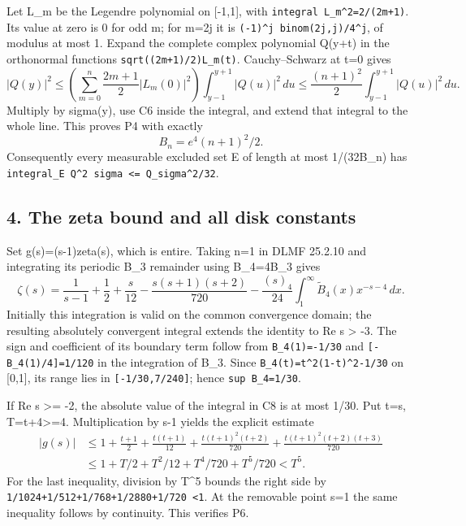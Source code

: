 Let L\_m be the Legendre polynomial on {[}-1,1{]}, with \texttt{integral\ L\_m\^{}2=2/(2m+1)}. Its value at zero is 0 for odd m; for m=2j it is \texttt{(-1)\^{}j\ binom(2j,j)/4\^{}j}, of modulus at most 1. Expand the complete complex polynomial Q(y+t) in the orthonormal functions \texttt{sqrt((2m+1)/2)L\_m(t)}. Cauchy--Schwarz at t=0 gives \[
|Q(y)|^2\le
 \left(\sum_{m=0}^n\frac{2m+1}{2}|L_m(0)|^2\right)
 \int_{y-1}^{y+1}|Q(u)|^2\,du
\le\frac{(n+1)^2}{2}\int_{y-1}^{y+1}|Q(u)|^2\,du.
\] Multiply by sigma(y), use C6 inside the integral, and extend that integral to the whole line. This proves P4 with exactly \[
B_n=e^4(n+1)^2/2.
\tag{C7}
\] Consequently every measurable excluded set E of length at most 1/(32B\_n) has \texttt{integral\_E\ \textbar{}Q\textbar{}\^{}2\ sigma\ \textless{}=\ \textbar{}\textbar{}Q\textbar{}\textbar{}\_sigma\^{}2/32}.

\subsection{4. The zeta bound and all disk constants}\label{mrcoerc:the-zeta-bound-and-all-disk-constants}

Set g(s)=(s-1)zeta(s), which is entire. Taking n=1 in DLMF 25.2.10 and integrating its periodic B\_3 remainder using B\_4\textquotesingle=4B\_3 gives \[
\zeta(s)=\frac1{s-1}+\frac12+\frac{s}{12}
 -\frac{s(s+1)(s+2)}{720}
 -\frac{(s)_4}{24}\int_1^\infty\widetilde B_4(x)x^{-s-4}\,dx.
\tag{C8}
\] Initially this integration is valid on the common convergence domain; the resulting absolutely convergent integral extends the identity to Re s \textgreater{} -3. The sign and coefficient of its boundary term follow from \texttt{B\_4(1)=-1/30} and \texttt{{[}-B\_4(1)/4{]}=1/120} in the integration of B\_3. Since \texttt{B\_4(t)=t\^{}2(1-t)\^{}2-1/30} on {[}0,1{]}, its range lies in \texttt{{[}-1/30,7/240{]}}; hence \texttt{sup\ \textbar{}B\_4\textbar{}=1/30}.

If Re s \textgreater= -2, the absolute value of the integral in C8 is at most 1/30. Put t=\textbar s\textbar, T=t+4\textgreater=4. Multiplication by s-1 yields the explicit estimate \[
\begin{aligned}
|g(s)|&\le1+\frac{t+1}{2}+\frac{t(t+1)}{12}
 +\frac{t(t+1)^2(t+2)}{720}
 +\frac{t(t+1)^2(t+2)(t+3)}{720}
\\
&\le1+T/2+T^2/12+T^4/720+T^5/720<T^5.
\end{aligned}
\tag{C9}
\] For the last inequality, division by T\^{}5 bounds the right side by \texttt{1/1024+1/512+1/768+1/2880+1/720\ \textless{}1}. At the removable point s=1 the same inequality follows by continuity. This verifies P6.

